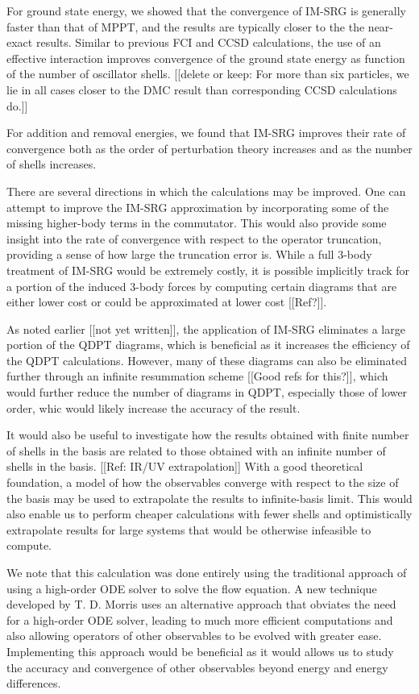For ground state energy, we showed that the convergence of IM-SRG is generally faster than that of MPPT, and the results are typically closer to the the near-exact results.  Similar to previous FCI \cite{2008arXiv0810.2644K} and CCSD \cite{PhysRevB.84.115302} calculations, the use of an effective interaction improves convergence of the ground state energy as function of the number of oscillator shells.  [[delete or keep: For more than six particles, we lie in all cases closer to the DMC result than corresponding CCSD calculations do.]]

For addition and removal energies, we found that IM-SRG improves their rate of convergence both as the order of perturbation theory increases and as the number of shells increases.

There are several directions in which the calculations may be improved.  One can attempt to improve the IM-SRG approximation by incorporating some of the missing higher-body terms in the commutator.  This would also provide some insight into the rate of convergence with respect to the operator truncation, providing a sense of how large the truncation error is.  While a full 3-body treatment of IM-SRG would be extremely costly, it is possible implicitly track for a portion of the induced 3-body forces by computing certain diagrams that are either lower cost or could be approximated at lower cost [[Ref?]].

As noted earlier [[not yet written]], the application of IM-SRG eliminates a large portion of the QDPT diagrams, which is beneficial as it increases the efficiency of the QDPT calculations.  However, many of these diagrams can also be eliminated further through an infinite resummation scheme [[Good refs for this?]], which would further reduce the number of diagrams in QDPT, especially those of lower order, whic would likely increase the accuracy of the result.

It would also be useful to investigate how the results obtained with finite
number of shells in the basis are related to those obtained with an infinite
number of shells in the basis.  [[Ref: IR/UV extrapolation]] With a
good theoretical foundation, a model of how the observables converge with
respect to the size of the basis may be used to extrapolate the results to
infinite-basis limit.  This would also enable us to perform cheaper
calculations with fewer shells and optimistically extrapolate results for
large systems that would be otherwise infeasible to compute.

We note that this calculation was done entirely using the traditional approach of using a high-order ODE solver to solve the flow equation.  A new technique developed by T. D. Morris \cite{PhysRevC.92.034331} uses an alternative approach that obviates the need for a high-order ODE solver, leading to much more efficient computations and also allowing operators of other observables to be evolved with greater ease.  Implementing this approach would be beneficial as it would allows us to study the accuracy and convergence of other observables beyond energy and energy differences.

